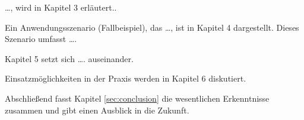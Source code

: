 \dots, wird in Kapitel 3 erläutert..

Ein Anwendungsszenario (Fallbeispiel), das \dots, ist in Kapitel 4 dargestellt. Dieses Szenario umfasst \dots.

Kapitel 5 setzt sich \dots. auseinander.

Einsatzmöglichkeiten in der Praxis werden in Kapitel 6 diskutiert.

Abschließend fasst Kapitel \ref{sec:conclusion} die wesentlichen Erkenntnisse zusammen und gibt einen Ausblick in die Zukunft.
\fi\makeatother

%
%
%
